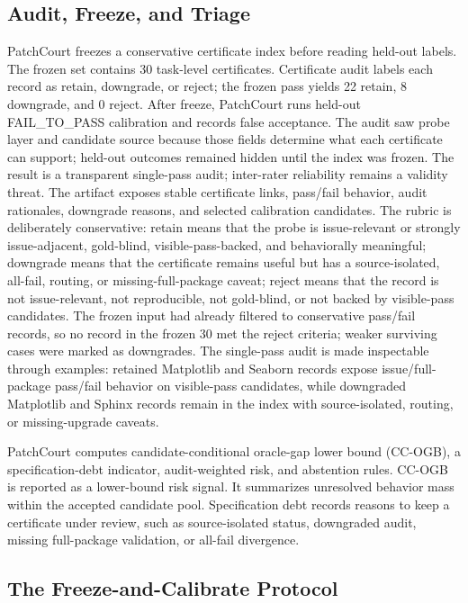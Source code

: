 \documentclass[conference]{IEEEtran}
\newcommand{\patchcourt}{PatchCourt\xspace}
\newcommand{\ccogb}{CC-OGB\xspace}
\begin{document}
\subsection{Audit, Freeze, and Triage}

\patchcourt freezes a conservative certificate index before reading held-out labels.
The frozen set contains 30 task-level certificates.
Certificate audit labels each record as retain, downgrade, or reject; the frozen pass yields 22 retain, 8 downgrade, and 0 reject.
After freeze, \patchcourt runs held-out FAIL\_TO\_PASS calibration and records false acceptance.
The audit saw probe layer and candidate source because those fields determine what each certificate can support; held-out outcomes remained hidden until the index was frozen.
The result is a transparent single-pass audit; inter-rater reliability remains a validity threat.
The artifact exposes stable certificate links, pass/fail behavior, audit rationales, downgrade reasons, and selected calibration candidates.
The rubric is deliberately conservative:
retain means that the probe is issue-relevant or strongly issue-adjacent, gold-blind, visible-pass-backed, and behaviorally meaningful;
downgrade means that the certificate remains useful but has a source-isolated, all-fail, routing, or missing-full-package caveat;
reject means that the record is not issue-relevant, not reproducible, not gold-blind, or not backed by visible-pass candidates.
The frozen input had already filtered to conservative pass/fail records, so no record in the frozen 30 met the reject criteria; weaker surviving cases were marked as downgrades.
The single-pass audit is made inspectable through examples: retained Matplotlib and Seaborn records expose issue/full-package pass/fail behavior on visible-pass candidates, while downgraded Matplotlib and Sphinx records remain in the index with source-isolated, routing, or missing-upgrade caveats.

\patchcourt computes candidate-conditional oracle-gap lower bound (\ccogb), a specification-debt indicator, audit-weighted risk, and abstention rules.
\ccogb is reported as a lower-bound risk signal.
It summarizes unresolved behavior mass within the accepted candidate pool.
Specification debt records reasons to keep a certificate under review, such as source-isolated status, downgraded audit, missing full-package validation, or all-fail divergence.

\subsection{The Freeze-and-Calibrate Protocol}
\end{document}
